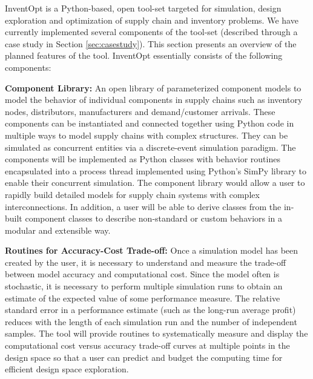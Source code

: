 InventOpt is a Python-based, open tool-set targeted for simulation, design exploration and optimization of supply chain and inventory problems. We have currently implemented several components of the tool-set (described through a case study in Section \ref{sec:casestudy}). This section presents an overview of the planned features of the tool. InventOpt essentially consists of the following components:

    \textbf{Component Library:} An open library of parameterized component models to model the behavior of individual components in supply chains such as inventory nodes, distributors, manufacturers and demand/customer arrivals. These components can be instantiated and connected together using Python code in multiple ways to model supply chains with complex structures. They can be simulated as concurrent entities via a discrete-event simulation paradigm. The components will be implemented as Python classes with behavior routines encapsulated into a process thread implemented using Python's SimPy library to enable their concurrent simulation. The component library would allow a user to rapidly build detailed models for supply chain systems with complex interconnections. In addition, a user will be able to derive classes from the in-built component classes to describe non-standard or custom behaviors in a modular and extensible way. 
    
    \textbf{Routines for Accuracy-Cost Trade-off:} Once a simulation model has been created by the user, it is necessary to understand and measure the trade-off between model accuracy and computational cost. Since the model often is stochastic, it is necessary to perform multiple simulation runs to obtain an estimate of the expected value of some performance measure. The relative standard error in a performance estimate (such as the long-run average profit) reduces with the length of each simulation run and the number of independent samples. The tool will provide routines to systematically measure and display the computational cost versus accuracy trade-off curves at multiple points in the design space so that a user can predict and budget the computing time for efficient design space exploration.
    
